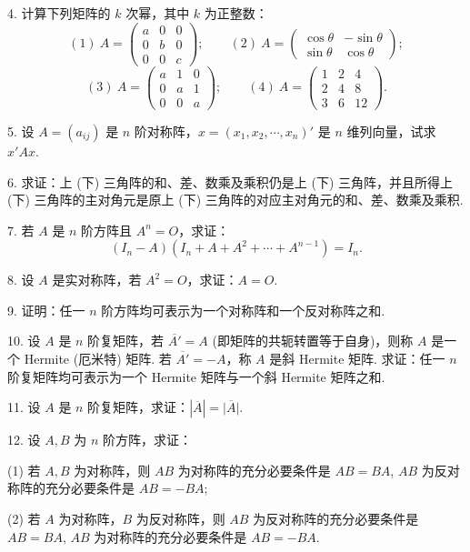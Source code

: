 \documentclass[UTF8,12pt,a4paper,fontset=fandol]{ctexart}
\begin{document}
4. 计算下列矩阵的 $k$ 次幂，其中 $k$ 为正整数：
\[
(1)\ A=\left(\begin{array}{ccc}
a & 0 & 0\\
0 & b & 0\\
0 & 0 & c
\end{array}\right);
\qquad
(2)\ A=\left(\begin{array}{cc}
\cos\theta & -\sin\theta\\
\sin\theta & \cos\theta
\end{array}\right);
\]
\[
(3)\ A=\left(\begin{array}{ccc}
a & 1 & 0\\
0 & a & 1\\
0 & 0 & a
\end{array}\right);
\qquad
(4)\ A=\left(\begin{array}{ccc}
1 & 2 & 4\\
2 & 4 & 8\\
3 & 6 & 12
\end{array}\right).
\]

5. 设 $A=(a_{ij})$ 是 $n$ 阶对称阵，$x=(x_1,x_2,\cdots,x_n)'$ 是 $n$ 维列向量，试求 $x'Ax$.

6. 求证：上 (下) 三角阵的和、差、数乘及乘积仍是上 (下) 三角阵，并且所得上 (下) 三角阵的主对角元是原上 (下) 三角阵的对应主对角元的和、差、数乘及乘积.

7. 若 $A$ 是 $n$ 阶方阵且 $A^n=O$，求证：
\[
(I_n-A)(I_n+A+A^2+\cdots+A^{n-1})=I_n.
\]

8. 设 $A$ 是实对称阵，若 $A^2=O$，求证：$A=O$.

9. 证明：任一 $n$ 阶方阵均可表示为一个对称阵和一个反对称阵之和.

10. 设 $A$ 是 $n$ 阶复矩阵，若 $\overline{A'}=A$ (即矩阵的共轭转置等于自身)，则称 $A$ 是一个 Hermite (厄米特) 矩阵. 若 $\overline{A'}=-A$，称 $A$ 是斜 Hermite 矩阵. 求证：任一 $n$ 阶复矩阵均可表示为一个 Hermite 矩阵与一个斜 Hermite 矩阵之和.

11. 设 $A$ 是 $n$ 阶复矩阵，求证：$|\overline{A}|=\overline{|A|}$.

12. 设 $A,B$ 为 $n$ 阶方阵，求证：

(1) 若 $A,B$ 为对称阵，则 $AB$ 为对称阵的充分必要条件是 $AB=BA$, $AB$ 为反对称阵的充分必要条件是 $AB=-BA$;

(2) 若 $A$ 为对称阵，$B$ 为反对称阵，则 $AB$ 为反对称阵的充分必要条件是 $AB=BA$, $AB$ 为对称阵的充分必要条件是 $AB=-BA$.
\end{document}
